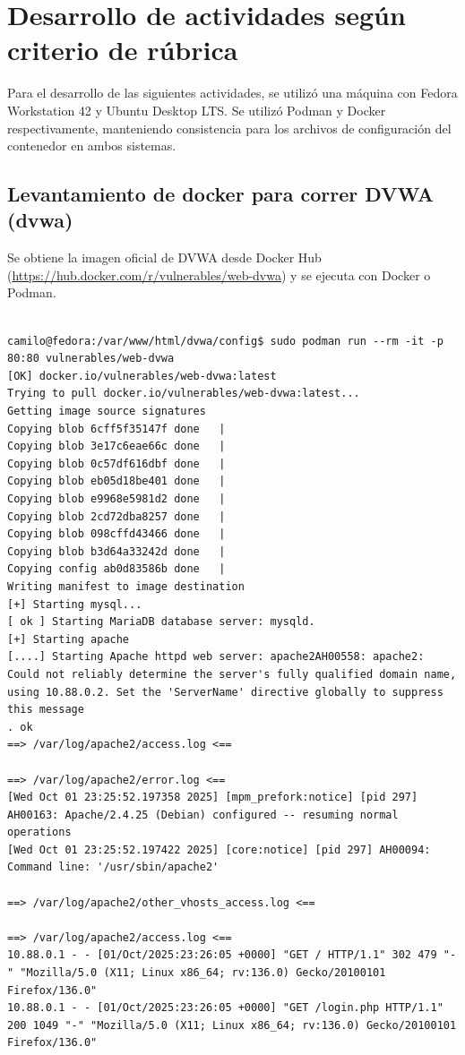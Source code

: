 \documentclass[letterpaper,12pt]{article}
\let\origsubsection\subsection
\renewcommand{\subsection}{\FloatBarrier\origsubsection}
\begin{document}
\section{Desarrollo de actividades según criterio de rúbrica}
Para el desarrollo de las siguientes actividades, se utilizó una máquina con Fedora Workstation 42 y Ubuntu Desktop LTS. Se utilizó Podman y Docker respectivamente, manteniendo consistencia para los archivos de configuración del contenedor en ambos sistemas.
\subsection{Levantamiento de docker para correr DVWA (dvwa)}
Se obtiene la imagen oficial de DVWA desde Docker Hub (\url{https://hub.docker.com/r/vulnerables/web-dvwa}) y se ejecuta con Docker o Podman.
\begin{verbatim}

camilo@fedora:/var/www/html/dvwa/config$ sudo podman run --rm -it -p 80:80 vulnerables/web-dvwa
[OK] docker.io/vulnerables/web-dvwa:latest
Trying to pull docker.io/vulnerables/web-dvwa:latest...
Getting image source signatures
Copying blob 6cff5f35147f done   | 
Copying blob 3e17c6eae66c done   | 
Copying blob 0c57df616dbf done   | 
Copying blob eb05d18be401 done   | 
Copying blob e9968e5981d2 done   | 
Copying blob 2cd72dba8257 done   | 
Copying blob 098cffd43466 done   | 
Copying blob b3d64a33242d done   | 
Copying config ab0d83586b done   | 
Writing manifest to image destination
[+] Starting mysql...
[ ok ] Starting MariaDB database server: mysqld.
[+] Starting apache
[....] Starting Apache httpd web server: apache2AH00558: apache2: Could not reliably determine the server's fully qualified domain name, using 10.88.0.2. Set the 'ServerName' directive globally to suppress this message
. ok 
==> /var/log/apache2/access.log <==

==> /var/log/apache2/error.log <==
[Wed Oct 01 23:25:52.197358 2025] [mpm_prefork:notice] [pid 297] AH00163: Apache/2.4.25 (Debian) configured -- resuming normal operations
[Wed Oct 01 23:25:52.197422 2025] [core:notice] [pid 297] AH00094: Command line: '/usr/sbin/apache2'

==> /var/log/apache2/other_vhosts_access.log <==

==> /var/log/apache2/access.log <==
10.88.0.1 - - [01/Oct/2025:23:26:05 +0000] "GET / HTTP/1.1" 302 479 "-" "Mozilla/5.0 (X11; Linux x86_64; rv:136.0) Gecko/20100101 Firefox/136.0"
10.88.0.1 - - [01/Oct/2025:23:26:05 +0000] "GET /login.php HTTP/1.1" 200 1049 "-" "Mozilla/5.0 (X11; Linux x86_64; rv:136.0) Gecko/20100101 Firefox/136.0"

\end{verbatim}
\end{document}
